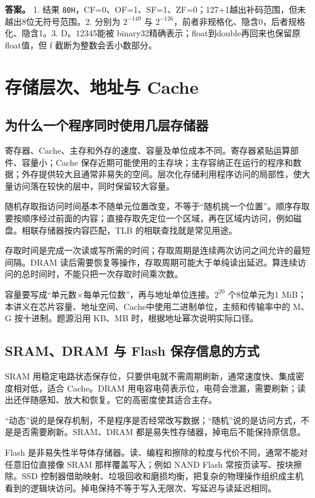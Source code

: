 \textbf{答案。} 1. 结果 \allowbreak{}\texttt{80H}，CF=0、OF=1、SF=1、ZF=0；127+1越出补码范围，但未越出8位无符号范围。2. 分别为 \(2^{-149}\) 与 \(2^{-126}\)，前者非规格化、隐含0，后者规格化、隐含1。3. D。12345能被 binary32精确表示；float到double再回来也保留原float值，但 f 截断为整数会丢小数部分。

\chapter{存储层次、地址与 Cache}\label{co-ch3}

\section{为什么一个程序同时使用几层存储器}\label{co-03-01}

寄存器、Cache、主存和外存的速度、容量及单位成本不同。寄存器紧贴运算部件、容量小；Cache 保存近期可能使用的主存块；主存容纳正在运行的程序和数据；外存提供较大且通常非易失的空间。层次化存储利用程序访问的局部性，使大量访问落在较快的层中，同时保留较大容量。

随机存取指访问时间基本不随单元位置改变，不等于``随机挑一个位置''。顺序存取要按顺序经过前面的内容；直接存取先定位一个区域，再在区域内访问，例如磁盘。相联存储器按内容匹配，TLB 的相联查找就是常见用途。

存取时间是完成一次读或写所需的时间；存取周期是连续两次访问之间允许的最短间隔。DRAM 读后需要恢复等操作，存取周期可能大于单纯读出延迟。算连续访问的总时间时，不能只把一次存取时间乘次数。

容量要写成``单元数×每单元位数''，再与地址单位连接。\(2^{20}\) 个8位单元为1 MiB；本讲义在芯片容量、地址空间、Cache中使用二进制单位，主频和传输率中的 M、G 按十进制。题源沿用 KB、MB 时，根据地址幂次说明实际口径。

\section{SRAM、DRAM 与 Flash 保存信息的方式}\label{co-03-02}

SRAM 用稳定电路状态保存位，只要供电就不需周期刷新，通常速度快、集成密度相对低，适合 Cache。DRAM 用电容电荷表示位，电荷会泄漏，需要刷新；读出还伴随感知、放大和恢复。它的高密度使其适合主存。

``动态''说的是保存机制，不是程序是否经常改写数据；``随机''说的是访问方式，不是是否需要刷新。SRAM、DRAM 都是易失性存储器，掉电后不能保持原信息。

Flash 是非易失性半导体存储器。读、编程和擦除的粒度与代价不同，通常不能对任意旧位直接像 SRAM 那样覆盖写入；例如 NAND Flash 常按页读写、按块擦除。SSD 控制器借助映射、垃圾回收和磨损均衡，把复杂的物理操作组织成主机看到的逻辑块访问。掉电保持不等于写入无限次、写延迟与读延迟相同。

